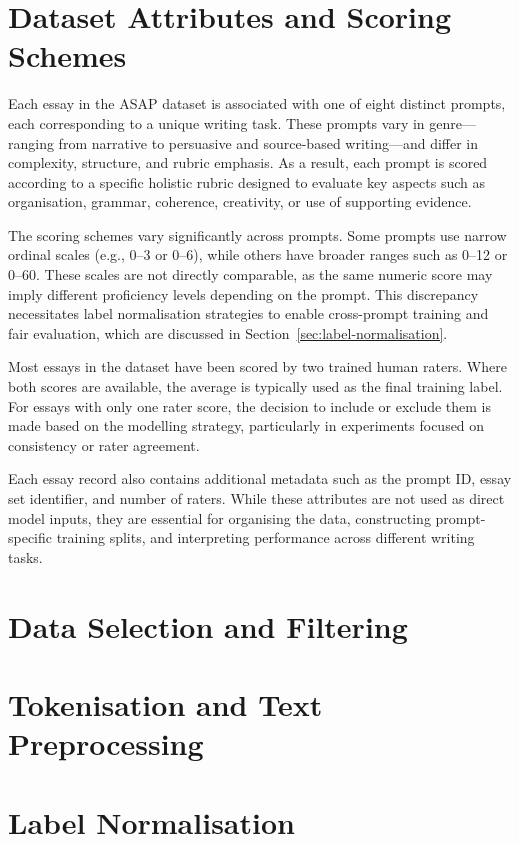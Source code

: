 \documentclass[8pt]{report}
\begin{document}
\section{Dataset Attributes and Scoring Schemes}

Each essay in the ASAP dataset is associated with one of eight distinct prompts, each corresponding to a unique writing task. These prompts vary in genre—ranging from narrative to persuasive and source-based writing—and differ in complexity, structure, and rubric 
emphasis. As a result, each prompt is scored according to a specific holistic rubric designed to evaluate key aspects such as organisation, grammar, coherence, creativity, or use of supporting evidence.

The scoring schemes vary significantly across prompts. Some prompts use narrow ordinal scales (e.g., 0--3 or 0--6), while others have broader ranges such as 0--12 or 0--60. These scales are not directly comparable, as the same numeric score may imply different 
proficiency levels depending on the prompt. This discrepancy necessitates label normalisation strategies to enable cross-prompt training and fair evaluation, which are discussed in Section~\ref{sec:label-normalisation}.

Most essays in the dataset have been scored by two trained human raters. Where both scores are available, the average is typically used as the final training label. For essays with only one rater score, the decision to include or exclude them is made based on 
the modelling strategy, particularly in experiments focused on consistency or rater agreement.

Each essay record also contains additional metadata such as the prompt ID, essay set identifier, and number of raters. While these attributes are not used as direct model inputs, they are essential for organising the data, constructing prompt-specific training 
splits, and interpreting performance across different writing tasks.




\section{Data Selection and Filtering}
\section{Tokenisation and Text Preprocessing}
\section{Label Normalisation}
\end{document}
